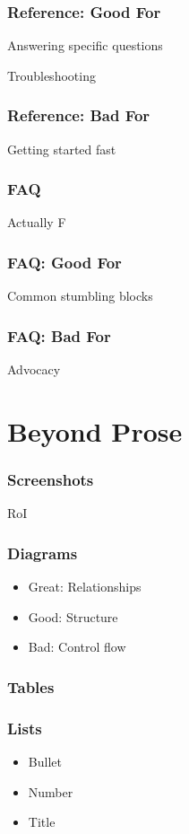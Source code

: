 \begin{frame}
\frametitle{Reference: Good For}

Answering specific questions

Troubleshooting
\end{frame}


\begin{frame}
\frametitle{Reference: Bad For}
Getting started fast
\end{frame}

\begin{frame}
\frametitle{FAQ}
Actually F
\end{frame}

\begin{frame}
\frametitle{FAQ: Good For}

Common stumbling blocks
\end{frame}

\begin{frame}
\frametitle{FAQ: Bad For}
Advocacy
\end{frame}


\section{Beyond Prose}


\begin{frame}
\frametitle{Screenshots}

RoI
\end{frame}

\begin{frame}
\frametitle{Diagrams}

\begin{itemize}
\item Great: Relationships
\item Good: Structure
\item Bad: Control flow
\end{itemize}


\end{frame}


\begin{frame}
\frametitle{Tables}
\end{frame}

\begin{frame}
\frametitle{Lists}

\begin{itemize}
\item Bullet
\item Number
\item Title
\end{itemize}

\end{frame}

